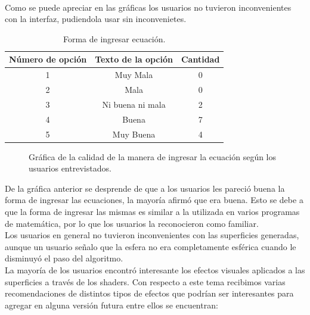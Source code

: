 \documentclass[12pt]{article}
\begin{document}
\\Como se puede apreciar en las gráficas los usuarios no tuvieron inconvenientes con la interfaz, pudiendola usar sin inconvenietes.
\clearpage
\begin{table}[h!]
  \centering
  \label{tab:table1}
  \begin{tabular}{ccc}
    \toprule
    Número de opción &  Texto de la opción &Cantidad\\
    \midrule
    1 & Muy Mala & 0 \\
    2 & Mala & 0 \\
    3 & Ni buena ni mala & 2 \\
    4 & Buena & 7\\
    5 & Muy Buena & 4\\
    \bottomrule
  \end{tabular}
  \caption{Forma de ingresar ecuación.}
\end{table}

  \begin{figure}[!ht]
    \centering
    \caption{Gráfica de la calidad de la manera de ingresar la ecuación según los usuarios entrevistados.}
    \label{fig:data}
  \end{figure}
De la gráfica anterior se desprende de que a los usuarios les pareció buena la forma de ingresar las ecuaciones, la mayoría afirmó que era buena. Esto se debe a que la forma de ingresar las mismas es similar a la utilizada en varios programas de matemática, por lo que los usuarios la reconocieron como familiar.
\\Los usuarios en general no tuvieron inconvenientes con las superficies generadas, aunque un usuario señalo que la esfera no era completamente esférica cuando le disminuyó el paso del algoritmo. 
\\La mayoría de los usuarios encontró interesante los efectos visuales aplicados a las superficies a través de los shaders. Con respecto a este tema recibimos varias recomendaciones de distintos tipos de efectos que podrían ser interesantes para agregar en alguna versión futura entre ellos se encuentran: 
\end{document}
